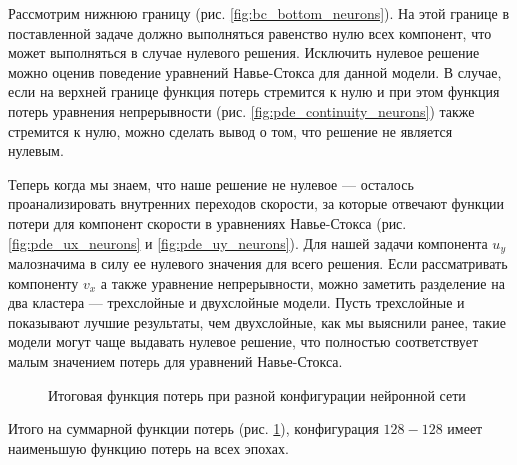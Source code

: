 Рассмотрим нижнюю границу (рис. \ref{fig:bc_bottom_neurons}). На этой границе в поставленной задаче должно
выполняться равенство нулю всех компонент, что может выполняться в случае нулевого решения. Исключить 
нулевое решение можно оценив поведение уравнений Навье-Стокса для данной модели. В случае, если на верхней
границе функция потерь стремится к нулю и при этом функция потерь уравнения непрерывности (рис. \ref{fig:pde_continuity_neurons})
также стремится к нулю, можно сделать вывод о том, что решение не является нулевым.

Теперь когда мы знаем, что наше решение не нулевое --- осталось проанализировать внутренних переходов скорости,
за которые отвечают функции потери для компонент скорости в уравнениях Навье-Стокса (рис. \ref{fig:pde_ux_neurons}
и \ref{fig:pde_uy_neurons}). Для нашей задачи компонента $u_y$ малозначима в силу ее нулевого значения для всего
решения. Если рассматривать компоненту $v_x$ а также уравнение непрерывности, можно заметить разделение на два
кластера --- трехслойные и двухслойные модели. Пусть трехслойные и показывают лучшие результаты, чем двухслойные,
как мы выяснили ранее, такие модели могут чаще выдавать нулевое решение, что полностью соответствует малым значением
потерь для уравнений Навье-Стокса.



\begin{figure}[H]
    \centering
    \caption{Итоговая функция потерь при разной конфигурации нейронной сети}
    \label{fig:total_loss_neurons}
\end{figure}

Итого на суммарной функции потерь (рис. \ref{fig:total_loss_neurons}),
конфигурация $128-128$ имеет наименьшую функцию потерь на всех эпохах.